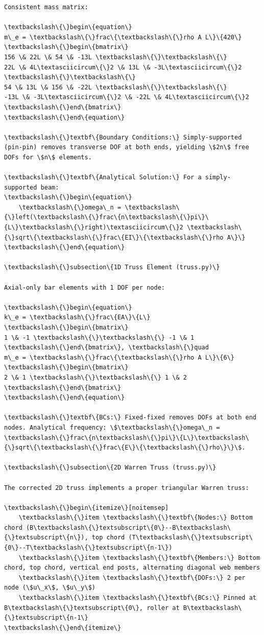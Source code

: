 \documentclass[12pt, a4paper]{article}
\begin{document}
\begin{lstlisting}[style=codestyle, caption={VQA\_Modal\_Analysis\_Report.tex}]
Consistent mass matrix:

\textbackslash\{\}begin\{equation\}
m\_e = \textbackslash\{\}frac\{\textbackslash\{\}rho A L\}\{420\}
\textbackslash\{\}begin\{bmatrix\}
156 \& 22L \& 54 \& -13L \textbackslash\{\}\textbackslash\{\}
22L \& 4L\textasciicircum\{\}2 \& 13L \& -3L\textasciicircum\{\}2 \textbackslash\{\}\textbackslash\{\}
54 \& 13L \& 156 \& -22L \textbackslash\{\}\textbackslash\{\}
-13L \& -3L\textasciicircum\{\}2 \& -22L \& 4L\textasciicircum\{\}2
\textbackslash\{\}end\{bmatrix\}
\textbackslash\{\}end\{equation\}

\textbackslash\{\}textbf\{Boundary Conditions:\} Simply-supported (pin-pin) removes transverse DOF at both ends, yielding \$2n\$ free DOFs for \$n\$ elements.

\textbackslash\{\}textbf\{Analytical Solution:\} For a simply-supported beam:
\textbackslash\{\}begin\{equation\}
    \textbackslash\{\}omega\_n = \textbackslash\{\}left(\textbackslash\{\}frac\{n\textbackslash\{\}pi\}\{L\}\textbackslash\{\}right)\textasciicircum\{\}2 \textbackslash\{\}sqrt\{\textbackslash\{\}frac\{EI\}\{\textbackslash\{\}rho A\}\}
\textbackslash\{\}end\{equation\}

\textbackslash\{\}subsection\{1D Truss Element (truss.py)\}

Axial-only bar elements with 1 DOF per node:

\textbackslash\{\}begin\{equation\}
k\_e = \textbackslash\{\}frac\{EA\}\{L\}
\textbackslash\{\}begin\{bmatrix\}
1 \& -1 \textbackslash\{\}\textbackslash\{\} -1 \& 1
\textbackslash\{\}end\{bmatrix\}, \textbackslash\{\}quad
m\_e = \textbackslash\{\}frac\{\textbackslash\{\}rho A L\}\{6\}
\textbackslash\{\}begin\{bmatrix\}
2 \& 1 \textbackslash\{\}\textbackslash\{\} 1 \& 2
\textbackslash\{\}end\{bmatrix\}
\textbackslash\{\}end\{equation\}

\textbackslash\{\}textbf\{BCs:\} Fixed-fixed removes DOFs at both end nodes. Analytical frequency: \$\textbackslash\{\}omega\_n = \textbackslash\{\}frac\{n\textbackslash\{\}pi\}\{L\}\textbackslash\{\}sqrt\{\textbackslash\{\}frac\{E\}\{\textbackslash\{\}rho\}\}\$.

\textbackslash\{\}subsection\{2D Warren Truss (truss.py)\}

The corrected 2D truss implements a proper triangular Warren truss:

\textbackslash\{\}begin\{itemize\}[noitemsep]
    \textbackslash\{\}item \textbackslash\{\}textbf\{Nodes:\} Bottom chord (B\textbackslash\{\}textsubscript\{0\}--B\textbackslash\{\}textsubscript\{n\}), top chord (T\textbackslash\{\}textsubscript\{0\}--T\textbackslash\{\}textsubscript\{n-1\})
    \textbackslash\{\}item \textbackslash\{\}textbf\{Members:\} Bottom chord, top chord, vertical end posts, alternating diagonal web members
    \textbackslash\{\}item \textbackslash\{\}textbf\{DOFs:\} 2 per node (\$u\_x\$, \$u\_y\$)
    \textbackslash\{\}item \textbackslash\{\}textbf\{BCs:\} Pinned at B\textbackslash\{\}textsubscript\{0\}, roller at B\textbackslash\{\}textsubscript\{n-1\}
\textbackslash\{\}end\{itemize\}


\end{lstlisting}
\end{document}
